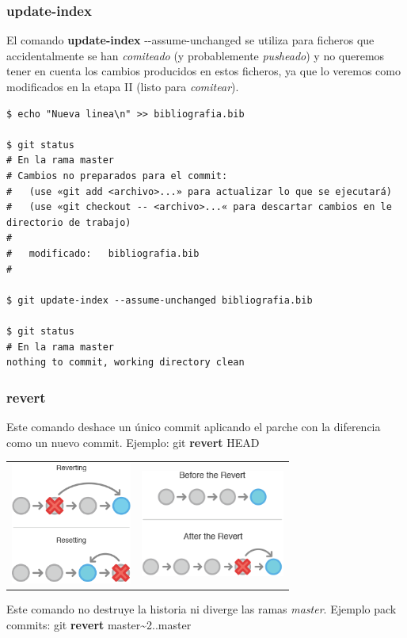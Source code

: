\begin{frame}[fragile]
\frametitle{update-index}
El comando \textbf{update-index} -{}-assume-unchanged se utiliza para ficheros que accidentalmente se han \textit{comiteado} (y probablemente \textit{pusheado}) y no queremos tener en cuenta los cambios producidos en estos ficheros, ya que lo veremos como modificados en la etapa II (listo para \textit{comitear}).
\footnotesize
\begin{verbatim}
$ echo "Nueva linea\n" >> bibliografia.bib

$ git status
# En la rama master
# Cambios no preparados para el commit:
#   (use «git add <archivo>...» para actualizar lo que se ejecutará)
#   (use «git checkout -- <archivo>...« para descartar cambios en le directorio de trabajo)
#
#	modificado:   bibliografia.bib
#

$ git update-index --assume-unchanged bibliografia.bib

$ git status
# En la rama master
nothing to commit, working directory clean
\end{verbatim}
\end{frame}

\frame
{
\frametitle{revert}
  Este comando deshace un único commit aplicando el parche con la diferencia como un nuevo commit. Ejemplo: git \textbf{revert} HEAD
 \begin{tabular}{p{4cm}|p{4cm}}\\
    \includegraphics[height=4cm]{imgs/revert-vs-reset.png}&
    \includegraphics[height=3.5cm]{imgs/revert-sample.png}\\
 \end{tabular}

 Este comando no destruye la historia ni diverge las ramas \textit{master}. Ejemplo pack commits: git \textbf{revert} master\textasciitilde2..master
}


